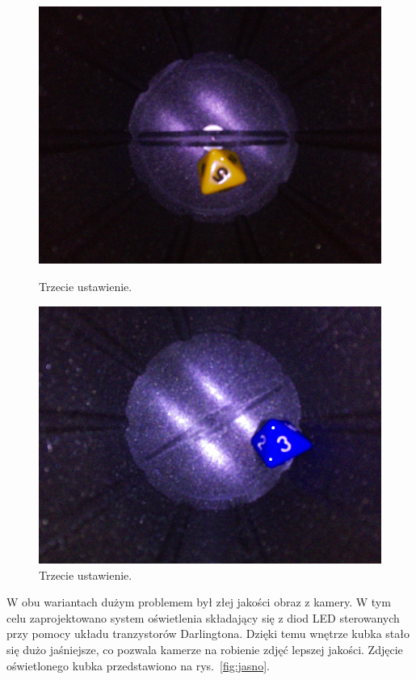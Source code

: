 \begin{figure}[H]
\begin{minipage}{0.32\textwidth}
        \centering
        \includegraphics[width=\linewidth]{chapters/03-praca-wlasna/figures/kolorki/zolte.jpg}
        \caption{\label{fig:yellow}Trzecie ustawienie.}
    \end{minipage}
    \hfill
    \begin{minipage}{0.32\textwidth}
        \centering
        \includegraphics[width=\linewidth]{chapters/03-praca-wlasna/figures/kolorki/niebieska.jpg}
        \caption{\label{fig:blue}Trzecie ustawienie.}
    \end{minipage}
\end{figure}

W obu wariantach dużym problemem był złej jakości obraz z kamery. W tym celu zaprojektowano system oświetlenia składający się z diod
LED sterowanych przy pomocy układu tranzystorów Darlingtona. Dzięki temu wnętrze kubka stało się dużo jaśniejsze, co pozwala kamerze na
robienie zdjęć lepszej jakości. Zdjęcie oświetlonego kubka przedstawiono na rys.~\ref{fig:jasno}. 

